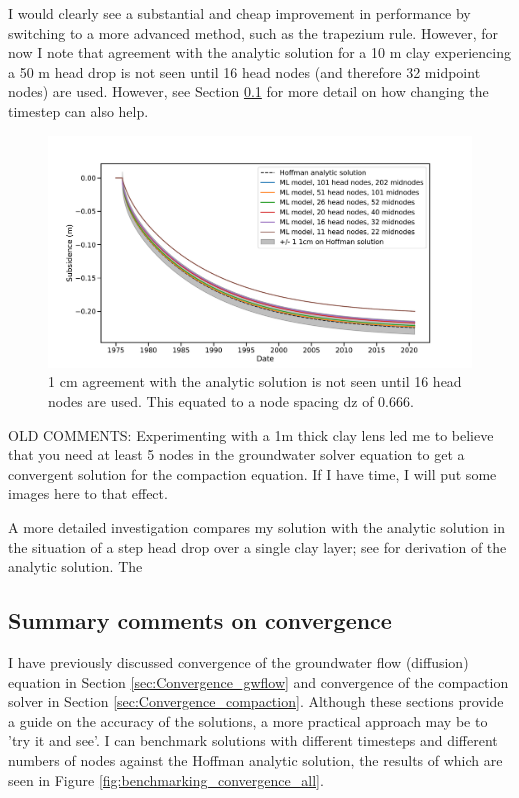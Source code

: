 \documentclass{article}
\begin{document}
I would clearly see a substantial and cheap improvement in performance by switching to a more advanced method, such as the trapezium rule. However, for now I note that agreement with the analytic solution for a 10 m clay experiencing a 50 m head drop is not seen until 16 head nodes (and therefore 32 midpoint nodes) are used. However, see Section \ref{sec:convergence-all} for more detail on how changing the timestep can also help.

\begin{figure}
\includegraphics[width=\linewidth]{Benchmark_Output_Comparisons_StepDrop.pdf}
\caption{1 cm agreement with the analytic solution is not seen until 16 head nodes are used. This equated to a node spacing dz of 0.666.}
\label{fig:overburden1}
\end{figure}

OLD COMMENTS:
Experimenting with a 1m thick clay lens led me to believe that you need at least 5 nodes in the groundwater solver equation to get a convergent solution for the compaction equation. If I have time, I will put some images here to that effect.

A more detailed investigation compares my solution with the analytic solution in the situation of a step head drop over a single clay layer; see \cite{hoffmann_inverse_2003} for derivation of the analytic solution. The 

\subsection{Summary comments on convergence}
\label{sec:convergence-all}

I have previously discussed convergence of the groundwater flow (diffusion) equation in Section \ref{sec:Convergence_gwflow} and convergence of the compaction solver in Section \ref{sec:Convergence_compaction}. Although these sections provide a guide on the accuracy of the solutions, a more practical approach may be to 'try it and see'. I can benchmark solutions with different timesteps and different numbers of nodes against the Hoffman analytic solution, the results of which are seen in Figure \ref{fig:benchmarking_convergence_all}. 
\end{document}
